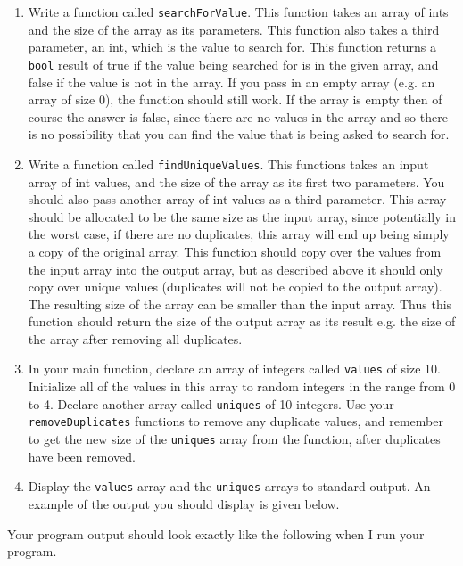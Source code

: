 \documentclass[11pt]{article}
\begin{document}
\begin{enumerate}
\item Write a function called \verb~searchForValue~.  This function takes
an array of ints and the size of the array as its parameters.  This
function also takes a third parameter, an int, which is the value to
search for.  This function returns a \verb~bool~ result of true if the
value being searched for is in the given array, and false if the
value is not in the array.  If you pass in an empty array (e.g. an
array of size 0), the function should still work.  If the array is
empty then of course the answer is false, since there are no values
in the array and so there is no possibility that you can find the
value that is being asked to search for.

\item Write a function called \verb~findUniqueValues~.  This functions
takes an input array of int values, and the size of the array
as its first two parameters.  You should also pass another
array of int values as a third parameter.  This array should
be allocated to be the same size as the input array, since
potentially in the worst case, if there are no duplicates,
this array will end up being simply a copy of the original
array.  This function should copy over the values from
the input array into the output array, but as described above
it should only copy over unique values (duplicates will
not be copied to the output array).  The resulting size of
the array can be smaller than the input array.  Thus this
function should return the size of the output array as
its result e.g. the size of the array after removing all
duplicates.

\item In your main function, declare an array of integers called \verb~values~
of size 10.  Initialize all of the values in this array to random
integers in the range from 0 to 4.  Declare another array called
\verb~uniques~ of 10 integers.  Use your \verb~removeDuplicates~ functions to
remove any duplicate values, and remember to get the new size of
the \verb~uniques~ array from the function, after duplicates have been
removed.

\item Display the \verb~values~ array and the \verb~uniques~ arrays to standard
output.  An example of the output you should display is given below.
\end{enumerate}

Your program output should look exactly like the following when I run
your program. 
\end{document}
